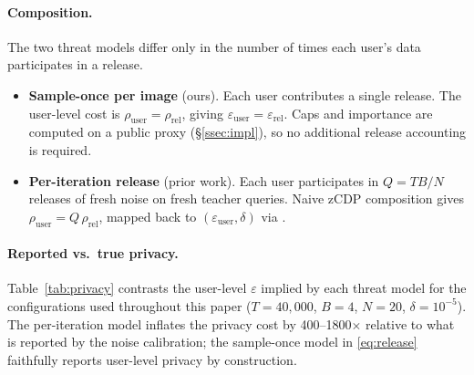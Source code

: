 \paragraph{Composition.}
The two threat models differ only in the number of times each user's
data participates in a release.
\begin{itemize}
\item \textbf{Sample-once per image} (ours). Each user contributes a
single release. The user-level cost is
$\rho_{\mathrm{user}} = \rho_{\mathrm{rel}}$, giving
$\varepsilon_{\mathrm{user}} = \varepsilon_{\mathrm{rel}}$. Caps and
importance are computed on a public proxy (\S\ref{ssec:impl}), so no
additional release accounting is required.
\item \textbf{Per-iteration release} (prior work). Each user
participates in $Q = TB/N$ releases of fresh noise on fresh teacher
queries. Naive zCDP composition gives
$\rho_{\mathrm{user}} = Q\,\rho_{\mathrm{rel}}$, mapped back to
$(\varepsilon_{\mathrm{user}}, \delta)$ via
\cite[Prop.~1.3]{bun2016concentrated}.
\end{itemize}

\paragraph{Reported vs.\ true privacy.}
Table~\ref{tab:privacy} contrasts the user-level $\varepsilon$ implied
by each threat model for the configurations used throughout this paper
($T{=}40{,}000$, $B{=}4$, $N{=}20$, $\delta{=}10^{-5}$). The
per-iteration model inflates the privacy cost by 400--1800$\times$
relative to what is reported by the noise calibration; the sample-once
model in \eqref{eq:release} faithfully reports user-level privacy by
construction.


